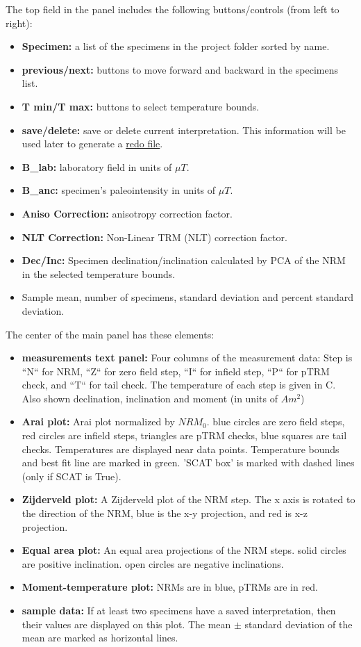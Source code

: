 \documentclass[11pt]{book}
\begin{document}
\noindent
	The top field in the  panel includes the following buttons/controls (from left to right):
	\begin{itemize}
\item {\bf Specimen:} a list of the specimens in the project folder sorted by name.
\item {\bf previous/next:} buttons to move forward and backward in the specimens list.
\item {\bf T min/T max:} buttons to select temperature bounds.
\item {\bf save/delete:} save or delete current interpretation. This information will be used later to generate a \href{#mk_redo.py}{redo file}.
\item {\bf B\_lab:} laboratory field in units of $\mu T$.
\item {\bf B\_anc:} specimen's paleointensity in units of $\mu T$.
\item {\bf Aniso Correction:} anisotropy correction factor.
\item {\bf NLT Correction:} Non-Linear TRM (NLT) correction factor.
\item {\bf Dec/Inc:} Specimen declination/inclination calculated by PCA of the NRM in the selected temperature bounds.
\item Sample mean, number of specimens, standard deviation and percent standard deviation.
\end{itemize}

The center of the main panel has these elements:

\begin{itemize}
\item {\bf measurements text panel:} Four columns of the measurement data: Step is ``N`` for NRM, ``Z`` for zero field step, ``I`` for infield step, ``P`` for pTRM check, and ``T`` for tail check. The temperature of each step is given in C. Also shown  declination, inclination and moment (in units of $Am^2$)
\item {\bf Arai plot:}  Arai plot normalized by $NRM_0$. blue circles are zero field steps, red circles are infield steps, triangles are pTRM checks, blue squares are tail checks. Temperatures are displayed near data points. Temperature bounds and best fit line are marked in green. 'SCAT box' is marked with dashed lines (only if SCAT is True).
\item {\bf Zijderveld plot:}  A Zijderveld plot of the NRM step.  The x axis is rotated to the direction of the NRM, blue is the x-y  projection, and red is x-z projection.
\item {\bf Equal area plot:}  An equal area projections  of the NRM steps. solid circles are positive inclination. open circles are negative inclinations.
\item {\bf Moment-temperature plot:}  NRMs are in blue, pTRMs are in red.
\item {\bf sample data:}  If at least two specimens have a saved interpretation, then their values are displayed on this plot. The mean $\pm$ standard deviation of the mean are marked as  horizontal lines.
\end{itemize}
\end{document}
